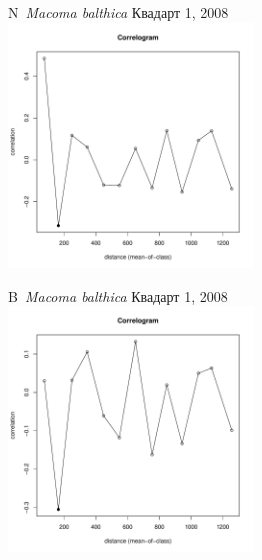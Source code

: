 \documentclass[12pt, a4paper]{disser}
\begin{document}
	\begin{figure}[h]

	\begin{minipage}[b]{.46\linewidth}
	\begin{center}
	{\small N~{\it Macoma balthica} Квадарт 1, 2008}
		\includegraphics[width=65mm]{../Barenc_Sea/distribution_Moran/Plyazh081_moran_N_Macoma_balthica_.pdf}
	\end{center}
	\end{minipage}
%
	\hfil %
%
	\begin{minipage}[b]{.46\linewidth}
	\begin{center}
	{\small B~{\it Macoma balthica} Квадарт 1, 2008}
		\includegraphics[width=65mm]{../Barenc_Sea/distribution_Moran/Plyazh081_moran_B_Macoma_balthica_.pdf}
	\end{center}
	\end{minipage}


\end{figure}
\end{document}
